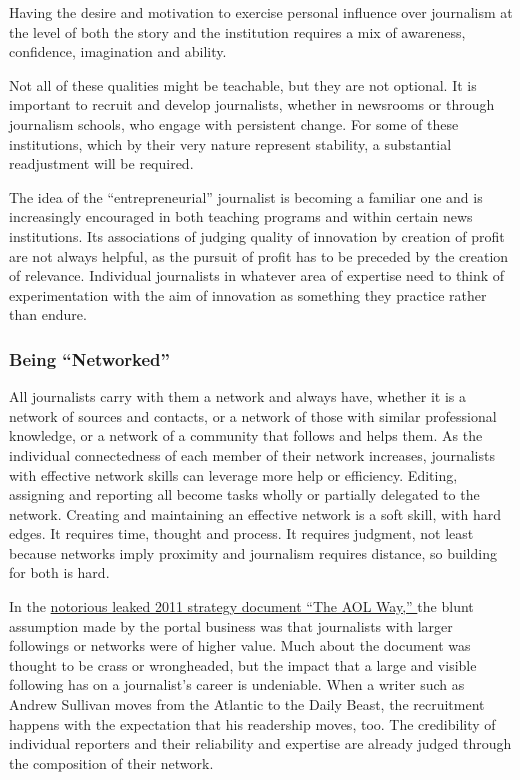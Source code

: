 Having the desire and motivation to exercise personal influence over journalism
at the level of both the story and the institution requires a mix of awareness,
confidence, imagination and ability.

Not all of these qualities might be teachable, but they are not optional. It is
important to recruit and develop journalists, whether in newsrooms or through
journalism schools, who engage with persistent change. For some of these institutions,
which by their very nature represent stability, a substantial readjustment
will be required.

The idea of the ``entrepreneurial'' journalist is becoming a familiar one and is
increasingly encouraged in both teaching programs and within certain news
institutions. Its associations of judging quality of innovation by creation of
profit are not always helpful, as the pursuit of profit has to be preceded by the
creation of relevance. Individual journalists in whatever area of expertise need
to think of experimentation with the aim of innovation as something they
practice rather than endure.

\subsubsection{Being ``Networked''}

All journalists carry with them a network and always have, whether it is a network
of sources and contacts, or a network of those with similar professional
knowledge, or a network of a community that follows and helps them. As the
individual connectedness of each member of their network increases, journalists
with effective network skills can leverage more help or efficiency. Editing, assigning
and reporting all become tasks wholly or partially delegated to the network.
Creating and maintaining an effective network is a soft skill, with hard edges.
It requires time, thought and process. It requires judgment, not least because
networks imply proximity and journalism requires distance, so building for
both is hard.

In the \href{http://www.businessinsider.com/the-aol-way?op=1}{notorious leaked 2011 strategy document ``The AOL Way,'' }the blunt
assumption made by the portal business was that journalists with larger followings
or networks were of higher value. Much about the document was thought
to be crass or wrongheaded, but the impact that a large and visible following has
on a journalist’s career is undeniable. When a writer such as Andrew Sullivan
moves from the Atlantic to the Daily Beast, the recruitment happens with the
expectation that his readership moves, too. The credibility of individual reporters
and their reliability and expertise are already judged through the composition of
their network.

